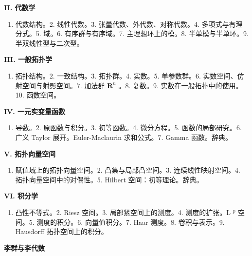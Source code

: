 \textbf{II. 代数学}\par

\begin{enumerate}
\def\labelenumi{\arabic{enumi}.}
\tightlist
\item
  代数结构。2. 线性代数。3. 张量代数、外代数、对称代数。4. 多项式与有理分式。5. 域。6. 有序群与有序域。7. 主理想环上的模。8. 半单模与半单环。9. 半双线性型与二次型。
\end{enumerate}

\textbf{III. 一般拓扑学}\par

\begin{enumerate}
\def\labelenumi{\arabic{enumi}.}
\tightlist
\item
  拓扑结构。2. 一致结构。3. 拓扑群。4. 实数。5. 单参数群。6. 实数空间、仿射空间与射影空间。7. 加法群 \(\mathbf{R}^n\) 。8. 复数。9. 实数在一般拓扑中的使用。10. 函数空间。
\end{enumerate}

\textbf{IV. 一元实变量函数}\par

\begin{enumerate}
\def\labelenumi{\arabic{enumi}.}
\tightlist
\item
  导数。2. 原函数与积分。3. 初等函数。4. 微分方程。5. 函数的局部研究。6. 广义 Taylor 展开。Euler-Maclaurin 求和公式。7. Gamma 函数。辞典。
\end{enumerate}

\textbf{V. 拓扑向量空间}\par

\begin{enumerate}
\def\labelenumi{\arabic{enumi}.}
\tightlist
\item
  赋值域上的拓扑向量空间。2. 凸集与局部凸空间。3. 连续线性映射空间。4. 拓扑向量空间中的对偶性。5. Hilbert 空间：初等理论。辞典。
\end{enumerate}

\textbf{VI. 积分学}\par

\begin{enumerate}
\def\labelenumi{\arabic{enumi}.}
\tightlist
\item
  凸性不等式。2. Riesz 空间。3. 局部紧空间上的测度。4. 测度的扩张。L \(^{p}\) 空间。5. 测度的积分。6. 向量值积分。7. Haar 测度。8. 卷积与表示。9. Hausdorff 拓扑空间上的积分。
\end{enumerate}


\textbf{李群与李代数}\par


